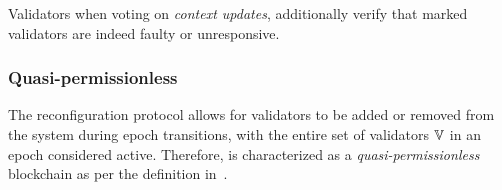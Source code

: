 Validators when voting on \emph{context updates}, additionally verify that marked validators are indeed faulty or unresponsive.

\subsubsection{Quasi-permissionless}

The reconfiguration protocol allows for validators to be added or removed from the system during epoch transitions, with the entire set of validators $\mathbb{V}$ in an epoch considered active. Therefore, \codename{} is characterized as a \emph{quasi-permissionless} blockchain as per the definition in~\cite{LR24}.